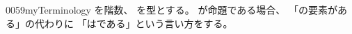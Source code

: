 \documentclass[index]{subfiles}
\begin{document}
\begin{myBlock}{0059}{myTerminology}
  を階数、
  を型とする。
  が命題である場合、
  「の要素がある」の代わりに
  「はである」という言い方をする。
\end{myBlock}
\end{document}
